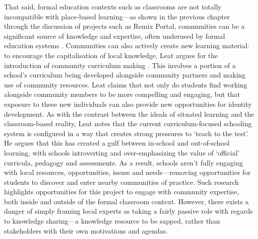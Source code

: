 That said, formal education contexts such as classrooms are not totally incompatible with place-based learning---as shown in the previous chapter through the discussion of projects such as Remix Portal, communities can be a significant source of knowledge and expertise, often underused by formal education systems \citep{Dodds2017}. Communities can also actively create new learning material: to encourage the capitalisation of local knowledge, Leat argues for the introduction of community curriculum making \citep{Leat2015}. This involves a portion of a school's curriculum being developed alongside community partners and making use of community resources. Leat claims that not only do students find working alongside community members to be more compelling and engaging, but that exposure to these new individuals can also provide new opportunities for identity development. As with the contrast between the ideals of situated learning and the classroom-based reality, Leat notes that the current curriculum-focused schooling system is configured in a way that creates strong pressures to `teach to the test'. He argues that this has created a gulf between in-school and out-of-school learning, with schools introverting and over-emphasizing the value of `official' curricula, pedagogy and assessments. As a result, schools aren't fully engaging with local resources, opportunities, issues and needs---removing opportunities for students to discover and enter nearby communities of practice. Such research highlights opportunities for this project to engage with community expertise, both inside and outside of the formal classroom context. However, there exists a danger of simply framing local experts as taking a fairly passive role with regards to knowledge sharing---a knowledge resource to be sapped, rather than stakeholders with their own motivations and agendas. 

